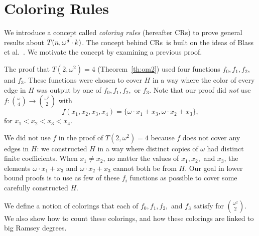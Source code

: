 \documentclass[11pt]{article}
\newcommand{\om}{\omega}
\newcommand{\capcrules}{Coloring Rules}
\newcommand{\crulenospace}{CR}
\newcommand{\crulesLong}{coloring rules}
\newcommand{\crules}{\crulenospace s~}
\newcommand{\crulesnospace}{\crulenospace s}
\newcommand{\numpoints}{n}
\theoremstyle{plain}
\theoremstyle{definition}
\begin{document}
\section{\capcrules}\label{se:strong} 

We introduce a concept called {\it \crulesLong} (hereafter \crulesnospace) to prove 
general results about
\linebreak
$T(\numpoints,\omega^d \cdot\nobreak k)$.
The concept behind \crules is built on the
ideas of Blass et al.~\cite{BDR21}.
We motivate the concept by examining a previous proof.

The proof that $T(2, \om^2) = 4$ (Theorem~\ref{th:om2})
used four functions $f_0,f_1,f_2$, and $f_3$. 
These functions were chosen to cover $H$ in a way where the color of every edge in $H$ 
was output by one of $f_0,f_1,f_2,$ or $f_3$.
Note that our proof did {\it not} use
$f\colon \binom{\om}{4} \to \binom{\om^2}{2}$ with
$$f(x_1,x_2,x_3,x_4) = \{\om \cdot x_1 + x_3, \om \cdot x_2 + x_3\},$$
for $x_1 < x_2 < x_3 < x_4.$

We did not use $f$ in the proof of $T(2, \om^2) = 4$
because $f$ does not cover any edges in $H$: we constructed $H$ in a 
way where distinct copies of $\om$ had distinct finite coefficients. When $x_1 \neq x_2$, no matter the values of $x_1, x_2,$ and 
$x_3$, the elements 
$\om \cdot x_1 + x_3$ and $\om \cdot x_2 + x_3$ cannot both be from $H$. Our goal in lower bound
proofs is to use as few of these $f_i$ functions as possible to cover some carefully constructed
$H.$

We define a notion of colorings that each of $f_0,f_1,f_2,$ and $f_3$ satisfy for $\binom{\om^2}{2}.$
We also show how to count these colorings, and how these colorings are linked to big Ramsey degrees.
\end{document}
